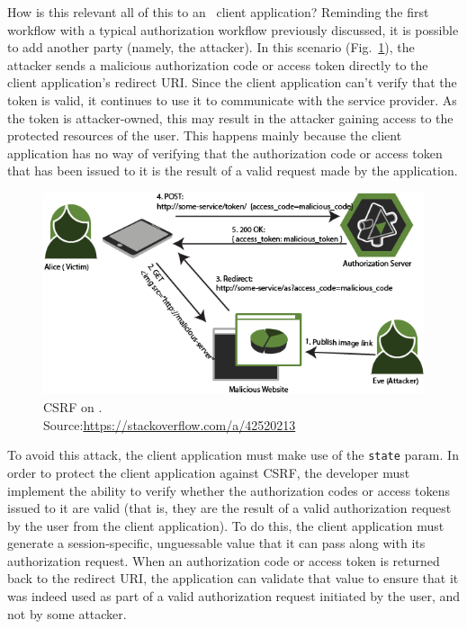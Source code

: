 How is this relevant all of this to an \oauth\ client application? 
Reminding the first workflow with a typical authorization workflow previously discussed, it is possible to add another party (namely, the attacker). In this scenario (Fig.~\ref{fig:csrf}), the attacker sends a malicious authorization code or access token directly to the client application's redirect URI. Since the client application can't verify that the token is valid, it continues to use it to communicate with the service provider. As the token is attacker-owned, this may result in the attacker gaining access to the protected resources of the user.
This happens mainly because the client application has no way of verifying that the authorization code or access token that has been issued to it is the result of a valid request made by the application.

\vspace{1.5cm}

\begin{figure}[ht]
    \centering
    \includegraphics[scale=0.65]{chapters/images/chp4/csrf.png}
    \caption[CSRF on \oauth]{CSRF on \oauth.\\\hspace{\textwidth}Source:\hspace{0.2cm}\url{https://stackoverflow.com/a/42520213}}
    \label{fig:csrf}
\end{figure}

\vspace{1.5cm}

To avoid this attack, the client application must make use of the \texttt{state} param.
In order to protect the client application against CSRF, the developer must implement the ability to verify whether the authorization codes or access tokens issued to it are valid (that is, they are the result of a valid authorization request by the user from the client application). To do this, the client application must generate a session-specific, unguessable value that it can pass along with its authorization request. When an authorization code or access token is returned back to the redirect URI, the application can validate that value to ensure that it was indeed used as part of a valid authorization request initiated by the user, and not by some attacker.

